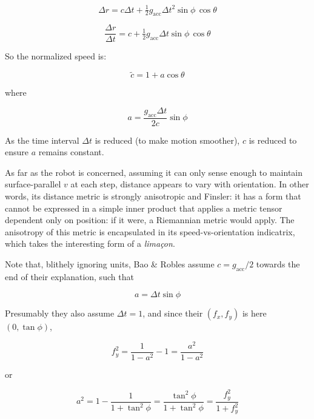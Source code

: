 \documentclass[11pt]{article}
\begin{document}
\begin{equation}
    \Delta{r} = c\Delta{t} 
        + \tfrac{1}{2} g_{\mathrm{acc}} \Delta{t}^2 \sin\phi\,\cos\theta 
\end{equation}

\begin{equation}
    \dfrac{\Delta{r}}{\Delta{t}}
        = c + \tfrac{1}{2} g_{\mathrm{acc}} \Delta{t} \sin\phi\,\cos\theta 
\end{equation}

So the normalized speed is:

\begin{equation}
    \tilde{c}
        = 1 + a \cos\theta 
\end{equation}

where

\begin{equation}
    a = \dfrac{g_{\mathrm{acc}}\Delta{t}}{2c} \sin\phi
\end{equation}

As the time interval \(\Delta{t}\) is reduced (to make motion smoother),
\(c\) is reduced to ensure \(a\) remains constant.

As far as the robot is concerned, assuming it can only sense enough to
maintain surface-parallel \(v\) at each step, distance appears to vary
with orientation. In other words, its distance metric is strongly
anisotropic and Finsler: it has a form that cannot be expressed in a
simple inner product that applies a metric tensor dependent only on
position: if it were, a Riemannian metric would apply. The anisotropy of
this metric is encapsulated in its speed-vs-orientation indicatrix,
which takes the interesting form of a \emph{limaçon}.

Note that, blithely ignoring units, Bao \& Robles assume
\(c = g_{\mathrm{acc}}/2\) towards the end of their explanation, such
that

\begin{equation}
    a = \Delta{t} \sin\phi
\end{equation}

Presumably they also assume \(\Delta{t}=1\), and since their
\((f_x, f_y)\) is here \((0,\tan\phi)\),

\begin{equation}
    f_y^2 =  \dfrac{1}{1-a^2} - 1 =  \dfrac{a^2}{1-a^2}
\end{equation}

or

\begin{equation}
    a^2 =  1-\dfrac{1}{1+\tan^2\phi}  =  \dfrac{\tan^2\phi}{1+\tan^2\phi} =  \dfrac{f_y^2}{1+f_y^2}
\end{equation}
\end{document}
